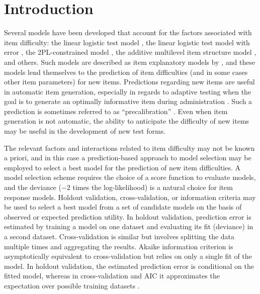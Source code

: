 \section{Introduction}

Several models have been developed that account for the factors associated with item difficulty: the linear logistic test model \parencite{Fischer1973}, the linear logistic test model with error \parencite{Janssen2004}, the 2PL-constrained model \parencite{embretson1999generating}, the additive multilevel item structure model \parencite{cho2014additive}, and others. Such models are described as item explanatory models by \textcite{Wilson2004}, and these models lend themselves to the prediction of item difficulties (and in some cases other item parameters) for new items. Predictions regarding new items are useful in automatic item generation, especially in regards to adaptive testing when the goal is to generate an optimally informative item during administration \parencite[see for example,][]{embretson1999generating}. Such a prediction is sometimes referred to as ``precalibration'' \parencite[see for example,][]{gierl2012automatic}. Even when item generation is not automatic, the ability to anticipate the difficulty of new items may be useful in the development of new test forms.

The relevant factors and interactions related to item difficulty may not be known a priori, and in this case a prediction-based approach to model selection may be employed to select a best model for the prediction of new item difficulties. A model selection scheme requires the choice of a score function to evaluate models, and the deviance ($-2$ times the log-likelihood) is a natural choice for item response models. Holdout validation, cross-validation, or information criteria may be used to select a best model from a set of candidate models on the basis of observed or expected prediction utility. In holdout validation, prediction error is estimated by training a model on one dataset and evaluating its fit (deviance) in a second dataset. Cross-validation is similar but involves splitting the data multiple times and aggregating the results. Akaike information criterion \parencite[AIC;][]{akaike1974new} is asymptotically equivalent to cross-validation \parencite{stone1977asymptotic} but relies on only a single fit of the model. In holdout validation, the estimated prediction error is conditional on the fitted model, whereas in cross-validation and AIC it approximates the expectation over possible training datasets \parencite{Hastie2009}.

